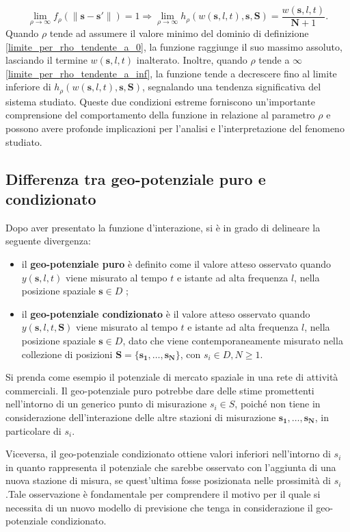 \begin{equation}
	\lim_{\rho \to \infty} f_\rho(\|\mathbf{s} - \mathbf{s'}\|) = 1
	\Rightarrow \lim_{\rho \to \infty} h_\rho(w(\mathbf{s}, l, t), \mathbf{s}, \mathbf{S}) = \frac{w(\mathbf{s}, l, t)}{\mathbf{N} + 1} .
	\label{limite_per_rho_tendente_a_inf}
\end{equation}
Quando $\rho$ tende ad assumere il valore minimo del dominio di definizione \ref{limite_per_rho_tendente_a_0}, la funzione raggiunge il suo massimo assoluto, lasciando il termine $w(\mathbf{s}, l, t)$ inalterato. Inoltre, quando 
$\rho$ tende a $\infty$  \ref{limite_per_rho_tendente_a_inf}, la funzione tende a decrescere fino al limite inferiore di $h_\rho(w(\mathbf{s}, l, t), \mathbf{s}, \mathbf{S})$, segnalando una tendenza significativa del sistema studiato. Queste due condizioni estreme forniscono un'importante comprensione del comportamento della funzione in relazione al parametro $\rho$ e possono avere profonde implicazioni per l'analisi e l'interpretazione del fenomeno studiato.

\subsection[Differenza tra geo-potenziale puro e condizionato]{Differenza tra geo-potenziale puro e condizionato}
Dopo aver presentato la funzione d'interazione, si è in grado di delineare la seguente divergenza:
\begin{itemize}
	\item il \textbf{geo-potenziale puro} è definito come  il valore atteso osservato quando $y(\mathbf{s}, l, t)$ viene misurato al tempo $t$ e istante ad alta frequenza $l$, nella posizione spaziale $\mathbf{s} \in D$ ;
	\item il \textbf{geo-potenziale condizionato} è il valore atteso osservato quando $y(\mathbf{s}, l, t, \mathbf{S})$
	viene misurato al tempo $t$ e istante ad alta frequenza $l$, nella posizione spaziale $\mathbf{s} \in D$, dato che viene contemporaneamente misurato nella collezione di posizioni $\mathbf{S} = \{\mathbf{s_1}, \ldots, \mathbf{s_N}\}$,  con $s_i \in D, N \geq 1$.
\end{itemize}
	Si prenda come esempio il potenziale di mercato spaziale in  una rete di attività commerciali. Il geo-potenziale puro potrebbe dare delle stime promettenti nell'intorno di un generico punto di misurazione $s_i \in S$, poiché non tiene in considerazione dell'interazione delle altre stazioni di misurazione $\mathbf{s_1}, \ldots, \mathbf{s_N}$, in particolare di $s_i$.
	\par Viceversa, il geo-potenziale condizionato ottiene valori inferiori nell'intorno di $s_i$ in quanto rappresenta il potenziale che sarebbe osservato con l'aggiunta di una  nuova stazione di misura, se quest'ultima fosse posizionata nelle prossimità di $s_i$.Tale osservazione è fondamentale per comprendere il motivo per il quale si necessita di un nuovo modello di previsione che tenga in considerazione il geo-potenziale condizionato.



